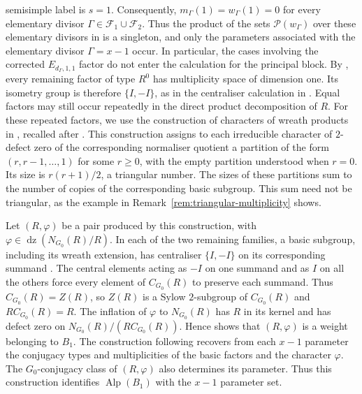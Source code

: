 \documentclass[10pt]{amsart}
\theoremstyle{definition}
\renewcommand{\geq}{\geqslant}
\let\oldendproof\endproof
\renewenvironment{proof}[1][\proofname]{%
  \oldproof[\bfseries #1]%
}{\oldendproof}
\DeclareMathOperator{\Alp}{Alp}
\DeclareMathOperator{\dz}{dz}
\numberwithin{equation}{section}
\numberwithin{table}{section}
\begin{document}
\begin{proof}
semisimple label is $s=1$.  Consequently, $m_\Gamma(1)=w_\Gamma(1)=0$ for
every elementary divisor $\Gamma\in\mathcal F_1\cup\mathcal F_2$.  Thus the product
of the sets $\mathcal P(w_\Gamma)$ over these elementary divisors in
\cite[Proposition~5.4]{FengMalle2022} is a singleton, and only the
parameters associated with the elementary divisor $\Gamma=x-1$ occur.  In particular, the cases involving the corrected
$E_{d_\Gamma,1,1}$ factor do not enter the calculation for the principal
block.  By \cite[Proposition~3.48]{FengYuZhang2024},
every remaining factor of type $R^0$ has multiplicity space of dimension
one. Its isometry group is therefore $\{I,-I\}$, as in the centraliser
calculation in \cite[proof of Proposition~3.48]{FengYuZhang2024}.
Equal factors may still occur repeatedly in the direct product
decomposition of $R$. For these repeated factors, we use
the construction of characters of wreath products in \cite[(6D)]{An1993},
recalled after \cite[Proposition~5.4]{FengMalle2022}.  This construction assigns to
each irreducible character of $2$-defect zero of the corresponding normaliser
quotient a partition of the form $(r,r-1,\ldots,1)$ for some $r\geq 0$,
with the empty partition understood when $r=0$.  Its size is
$r(r+1)/2$, a triangular number.  The sizes of these partitions
sum to the number of copies of the corresponding basic subgroup.
This sum need not be triangular, as the example in
Remark~\ref{rem:triangular-multiplicity} shows.

Let $(R,\varphi)$ be a pair produced by this construction, with
$\varphi\in\dz(N_{G_0}(R)/R)$.
In each of the two remaining families, a basic subgroup, including its
wreath extension, has centraliser $\{I,-I\}$ on its corresponding summand
\cite[p.~198]{An1993}.
The central elements acting as $-I$ on one summand and as $I$ on all the
others force every element of $C_{G_0}(R)$ to preserve each summand.  Thus $C_{G_0}(R)=Z(R)$, so $Z(R)$ is a Sylow $2$-subgroup
of $C_{G_0}(R)$ and $RC_{G_0}(R)=R$.
The inflation of $\varphi$ to $N_{G_0}(R)$ has $R$ in its kernel
and has defect zero on $N_{G_0}(R)/(RC_{G_0}(R))$.
Hence \cite[Lemma~2.3]{FengYuZhang2024} shows that
$(R,\varphi)$ is a weight belonging to $B_1$.
The construction following \cite[Proposition~5.4]{FengMalle2022}
recovers from each $x-1$ parameter the conjugacy types and
multiplicities of the basic factors and the character $\varphi$.
The $G_0$-conjugacy class of $(R,\varphi)$ also determines
its parameter. Thus this construction identifies $\Alp(B_1)$
with the $x-1$ parameter set.


\end{proof}
\end{document}
